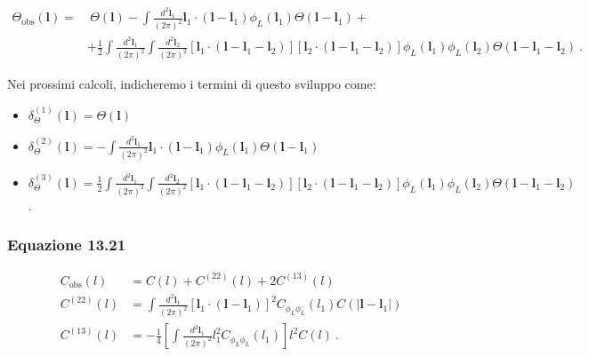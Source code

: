 \documentclass[a4paper,10pt]{article}
\newcommand{\B}{\boldsymbol}
\begin{document}
\begin{equation} \label{eq:sviluppotheta}
\begin{aligned}
    \Theta_{\text{obs}}(\boldsymbol{l}) = & \ \Theta(\boldsymbol{l}) - \int \frac{d^2 \B l_1}{(2\pi)^2} \boldsymbol{l}_1 \cdot (\B l - \B l_1) \phi_L(\boldsymbol{l}_1) \Theta(\B l - \B l_1) + \\
        & + \frac{1}{2} \int \frac{d^2 \B l_1}{(2\pi)^2} \int \frac{d^2 \B l_2}{(2\pi)^2} [\B l_1 \cdot (\B l - \B l_1 - \B l_2)] [\B l_2 \cdot (\B l - \B l_1 - \B l_2)] \phi_L(\B l_1) \phi_L(\B l_2) \Theta(\B l - \B l_1 - \B l_2) \ .
\end{aligned}
\end{equation}

Nei prossimi calcoli, indicheremo i termini di questo sviluppo come:

\begin{itemize}
    
    \item $\delta_\Theta^{(1)} (\B l) = \Theta(\B l)$
    
    \item $\displaystyle \delta_\Theta^{(2)} (\B l) = - \int \frac{d^2 \B l_1}{(2\pi)^2} \boldsymbol{l}_1 \cdot (\B l - \B l_1) \phi_L(\boldsymbol{l}_1) \Theta(\B l - \B l_1)$

    \item $\displaystyle \delta_\Theta^{(3)} (\B l) = \frac{1}{2} \int \frac{d^2 \B l_1}{(2\pi)^2} \int \frac{d^2 \B l_2}{(2\pi)^2} [\B l_1 \cdot (\B l - \B l_1 - \B l_2)] [\B l_2 \cdot (\B l - \B l_1 - \B l_2)] \phi_L(\B l_1) \phi_L(\B l_2) \Theta(\B l - \B l_1 - \B l_2)$ .

\end{itemize}





\subsubsection*{Equazione 13.21}

\begin{equation} \label{eq:13.21}
\begin{aligned}
    C_{\text{obs}}(l) &= C(l) + C^{(22)}(l) + 2C^{(13)}(l) \\
    C^{(22)}(l) &= \int \frac{d^2 \B l_1}{(2\pi)^2} \left[ \boldsymbol{l}_1 \cdot (\boldsymbol{l} - \boldsymbol{l}_1) \right]^2 C_{\phi_L\phi_L}(l_1) C(|\boldsymbol{l} - \boldsymbol{l}_1|) \\
    C^{(13)}(l) &= -\frac{1}{4} \left[ \int \frac{d^2 \B l_1}{(2\pi)^2} l_1^2 C_{\phi_L\phi_L}(l_1) \right] l^2 C(l) \ .
\end{aligned}
\end{equation}
\end{document}
